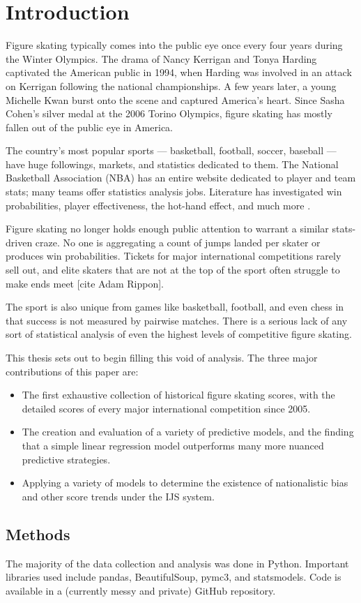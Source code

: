 \chapter{Introduction}
\label{introduction}

Figure skating typically comes into the public eye once every four years during the Winter Olympics. The drama of Nancy Kerrigan and Tonya Harding captivated the American public in 1994, when Harding was involved in an attack on Kerrigan following the national championships. A few years later, a young Michelle Kwan burst onto the scene and captured America’s heart. Since Sasha Cohen’s silver medal at the 2006 Torino Olympics, figure skating has mostly fallen out of the public eye in America.

The country’s most popular sports — basketball, football, soccer, baseball — have huge followings, markets, and statistics dedicated to them. The National Basketball Association (NBA) has an entire website dedicated to player and team stats; many teams offer statistics analysis jobs. Literature has investigated win probabilities, player effectiveness, the hot-hand effect, and much more \cite{Knuth1968}.

Figure skating no longer holds enough public attention to warrant a similar stats-driven craze. No one is aggregating a count of jumps landed per skater or produces win probabilities. Tickets for major international competitions rarely sell out, and elite skaters that are not at the top of the sport often struggle to make ends meet [cite Adam Rippon].

The sport is also unique from games like basketball, football, and even chess in that success is not measured by pairwise matches. There is a serious lack of any sort of statistical analysis of even the highest levels of competitive figure skating.

This thesis sets out to begin filling this void of analysis. The three major contributions of this paper are:
\begin{itemize}
    \item The first exhaustive collection of historical figure skating scores, with the detailed scores of every major international competition since 2005.
    \item The creation and evaluation of a variety of predictive models, and the finding that a simple linear regression model outperforms many more nuanced predictive strategies.
    \item Applying a variety of models to determine the existence of nationalistic bias and other score trends under the IJS system.
\end{itemize}



\section{Methods}
The majority of the data collection and analysis was done in Python. Important libraries used include pandas, BeautifulSoup, pymc3, and statsmodels. Code is available in a (currently messy and private) GitHub repository.
